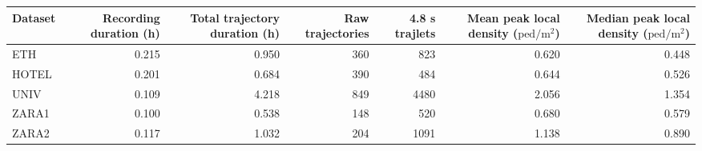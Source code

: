 \begin{tabular}{lrrrrrr}
Dataset & Recording duration (h) & Total trajectory duration (h) & Raw trajectories & 4.8 s trajlets & Mean peak local density ($\mathrm{ped}/\mathrm{m}^2$) & Median peak local density ($\mathrm{ped}/\mathrm{m}^2$) \\
\hline
ETH & 0.215 & 0.950 & 360 & 823 & 0.620 & 0.448 \\
HOTEL & 0.201 & 0.684 & 390 & 484 & 0.644 & 0.526 \\
UNIV & 0.109 & 4.218 & 849 & 4480 & 2.056 & 1.354 \\
ZARA1 & 0.100 & 0.538 & 148 & 520 & 0.680 & 0.579 \\
ZARA2 & 0.117 & 1.032 & 204 & 1091 & 1.138 & 0.890 \\
\end{tabular}
